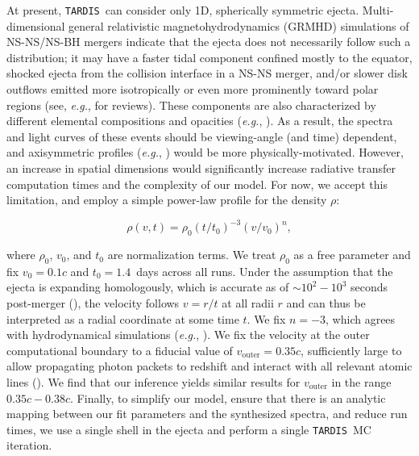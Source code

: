 \documentclass[twocolumn, twocolappendix]{aastex63}
\def\TARDIS{\texttt{TARDIS}}
\def\eg{{\it e.g.}}
\begin{document}
At present, \TARDIS~can consider only 1D, spherically symmetric ejecta. Multi-dimensional general relativistic magnetohydrodynamics (GRMHD) simulations of NS-NS/NS-BH mergers indicate that the ejecta does not necessarily follow such a distribution; it may have a faster tidal component confined mostly to the equator, shocked ejecta from the collision interface in a NS-NS merger, and/or slower disk outflows emitted more isotropically or even more prominently toward polar regions (see, \eg, \citealt{fernandez16, baiotti17, shibata19, radice20} for reviews). These components are also characterized by different elemental compositions and opacities (\eg, \citealt{wanajo14, just15, mendoza-temis15, wu16}). As a result, the spectra and light curves of these events should be viewing-angle (and time) dependent, and axisymmetric profiles (\eg, \citealt{wollaeger18, bulla19, darbha20, kawaguchi20, korobkin21, wollaeger21}) would be more physically-motivated. However, an increase in spatial dimensions would significantly increase radiative transfer computation times and the complexity of our model. For now, we accept this limitation, and employ a simple power-law profile for the density $\rho$:

\begin{equation}\label{eqn:plaw_dens}
    \rho(v, t) = \rho_0 (t / t_0)^{-3} (v / v_0)^{n} , 
\end{equation}

\noindent where $\rho_0$, $v_0$, and $t_0$ are normalization terms.  We treat $\rho_0$ as a free parameter and fix $v_0 = 0.1c$ and $t_0 = 1.4$~days across all runs. Under the assumption that the ejecta is expanding homologously, which is accurate as of $\sim 10^2-10^3 $ seconds post-merger (\citealt{metzger10, kasen13, rosswog14, grossman14}), the velocity follows $v = r/t$ at all radii $r$ and can thus be interpreted as a radial coordinate at some time $t$. We fix $n=-3$, which agrees with hydrodynamical simulations (\eg, \citealt{kasen17, tanaka17, watson19}). We fix the velocity at the outer computational boundary to a fiducial value of $v_{\mathrm{outer}} = 0.35c$, sufficiently large to allow propagating photon packets to redshift and interact with all relevant atomic lines (\citealt{gillanders22}). We find that our inference yields similar results for $v_{\mathrm{outer}}$ in the range $0.35c - 0.38c$. Finally, to simplify our model, ensure that there is an analytic mapping between our fit parameters and the synthesized spectra, and reduce run times, we use a single shell in the ejecta and perform a single \TARDIS~MC iteration.
\end{document}
